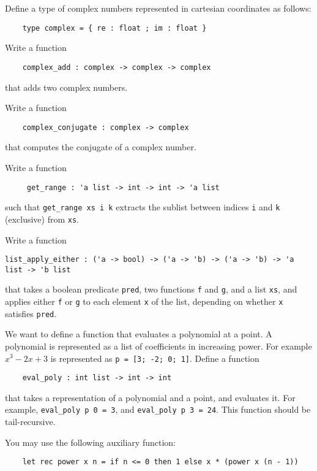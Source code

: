 \documentclass[arhiv]{../izpit}
\begin{document}

\naloga[]

Define a type of complex numbers represented in cartesian coordinates as follows:
\begin{verbatim}
    type complex = { re : float ; im : float }
\end{verbatim}


\podnaloga
Write a function
\begin{verbatim}
    complex_add : complex -> complex -> complex
\end{verbatim}
that adds two complex numbers.

\podnaloga
Write a function
\begin{verbatim}
    complex_conjugate : complex -> complex
\end{verbatim}
that computes the conjugate of a complex number.

\podnaloga
Write a function
\begin{verbatim}
     get_range : 'a list -> int -> int -> 'a list
\end{verbatim}
such that \verb|get_range xs i k| extracts the sublist between indices \verb|i| and \verb|k| (exclusive) from \verb|xs|.

\podnaloga
Write a function
\begin{verbatim}
list_apply_either : ('a -> bool) -> ('a -> 'b) -> ('a -> 'b) -> 'a list -> 'b list
\end{verbatim}
that takes a boolean predicate \verb|pred|, two functions \verb|f| and \verb|g|, and a list \verb|xs|, and applies either \verb|f| or \verb|g| to each element \verb|x| of the list, depending on whether \verb|x| satisfies \verb|pred|.

\podnaloga
We want to define a function that evaluates a polynomial at a point. A polynomial is represented as a list of coefficients in increasing power.
For example $x^3 - 2x + 3$ is represented as \verb|p = [3; -2; 0; 1]|.
Define a function
\begin{verbatim}
    eval_poly : int list -> int -> int
\end{verbatim}
that takes a representation of a polynomial and a point, and evaluates it. For example, \verb|eval_poly p 0 = 3|, and \verb|eval_poly p 3 = 24|. This function should be tail-recursive.

You may use the following auxiliary function:
\begin{verbatim}
    let rec power x n = if n <= 0 then 1 else x * (power x (n - 1))
\end{verbatim}
\end{document}
